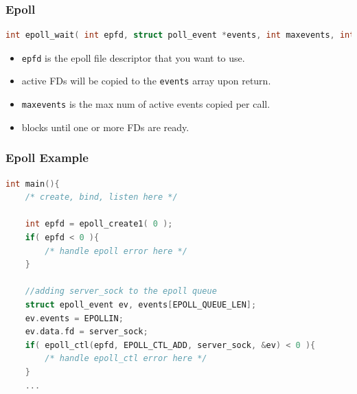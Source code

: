 \documentclass[aspectratio=43]{beamer}
\begin{document}
\begin{frame}[fragile]
  \frametitle{Epoll}
  
    \begin{lstlisting}[language=C++,basicstyle=\ttfamily\footnotesize,commentstyle=\color{commgreen},keywordstyle=\color{blue},breaklines=true]
int epoll_wait( int epfd, struct poll_event *events, int maxevents, int timeout );
\end{lstlisting}

\begin{itemize}
\item {\tt epfd} is the epoll file descriptor that you want to use.
\item active FDs will be copied to the {\tt events} array upon return.
\item {\tt maxevents} is the max num of active events copied per call.
\item blocks until one or more FDs are ready.
\end{itemize}
\end{frame}

\begin{frame}[fragile]
  \frametitle{Epoll Example}
\begin{lstlisting}[language=C++,basicstyle=\ttfamily\footnotesize,commentstyle=\color{commgreen},keywordstyle=\color{blue},breaklines=true]
int main(){
    /* create, bind, listen here */
    
    int epfd = epoll_create1( 0 );
    if( epfd < 0 ){
        /* handle epoll error here */
    }

    //adding server_sock to the epoll queue
    struct epoll_event ev, events[EPOLL_QUEUE_LEN];
    ev.events = EPOLLIN;
    ev.data.fd = server_sock;
    if( epoll_ctl(epfd, EPOLL_CTL_ADD, server_sock, &ev) < 0 ){
        /* handle epoll_ctl error here */
    }
    ...
   \end{lstlisting}
\end{frame}
\end{document}
